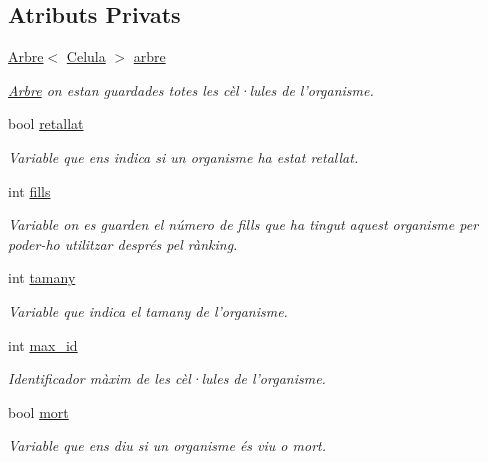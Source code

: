 \subsection*{Atributs Privats}
\begin{DoxyCompactItemize}
\item 
\hyperlink{class_arbre}{Arbre}$<$ \hyperlink{struct_celula}{Celula} $>$ \hyperlink{class_organisme_aa6bc89f1937afd04f86e770c2bde8c69}{arbre}
\begin{DoxyCompactList}\small\item\em \hyperlink{class_arbre}{Arbre} on estan guardades totes les cèl·lules de l'organisme. \end{DoxyCompactList}\item 
bool \hyperlink{class_organisme_acf912225a83570cb68542dcc6709023a}{retallat}
\begin{DoxyCompactList}\small\item\em Variable que ens indica si un organisme ha estat retallat. \end{DoxyCompactList}\item 
int \hyperlink{class_organisme_a4644da413bb0e38f34566334ebee1c1c}{fills}
\begin{DoxyCompactList}\small\item\em Variable on es guarden el número de fills que ha tingut aquest organisme per poder-\/ho utilitzar després pel rànking. \end{DoxyCompactList}\item 
int \hyperlink{class_organisme_a5d30992b5ded1a9314aff94ce9fb3932}{tamany}
\begin{DoxyCompactList}\small\item\em Variable que indica el tamany de l'organisme. \end{DoxyCompactList}\item 
int \hyperlink{class_organisme_ae7f51a74f01cee155cf88a5b01545f78}{max\-\_\-id}
\begin{DoxyCompactList}\small\item\em Identificador màxim de les cèl·lules de l'organisme. \end{DoxyCompactList}\item 
bool \hyperlink{class_organisme_ae20564db8d9ba5b7547750375010ed7b}{mort}
\begin{DoxyCompactList}\small\item\em Variable que ens diu si un organisme és viu o mort. \end{DoxyCompactList}\end{DoxyCompactItemize}


